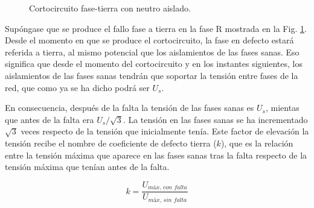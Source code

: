             \begin{figure}
                \centering
                \caption{Cortocircuito fase-tierra con neutro aislado.}
                \label{fig:cortoFTAislado}
            \end{figure}

            Supóngase que se produce el fallo fase a tierra en la fase R mostrada en la Fig. \ref{fig:cortoFTAislado}. Desde el momento en que se produce el cortocircuito, la fase en defecto estará referida a tierra, al mismo potencial que los aislamientos de las fases sanas. Eso significa que desde el momento del cortocircuito y en los instantes siguientes, los aislamientos de las fases sanas tendrán que soportar la tensión entre fases de la red, que como ya se ha dicho podrá ser $U_\textit{s}$.\newline
            
            En consecuencia, después de la falta la tensión de las fases sanas es $U_\textit{s}$, mientas que antes de la falta era $U_\textit{s}/\sqrt{3}$. La tensión en las fases sanas se ha incrementado $\sqrt{3}$ veces respecto de la tensión que inicialmente tenía. Este factor de elevación la tensión recibe el nombre de coeficiente de defecto tierra ($k$), que es la relación entre la tensión máxima que aparece en las fases sanas tras la falta respecto de la tensión máxima que tenían antes de la falta.

            \begin{equation}
                k = \dfrac{U_\textit{máx, con falta}}{U_\textit{máx, sin falta}}
            \end{equation}

